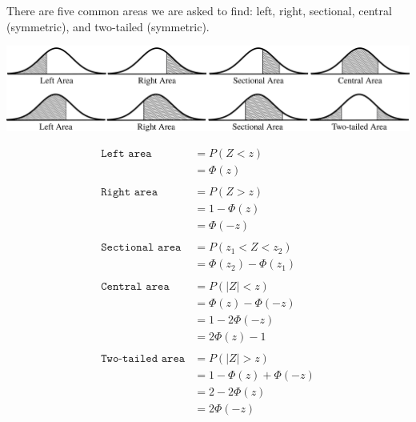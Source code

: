 \documentclass[12pt,letterpaper]{article}
\begin{document}
There are five common areas we are asked to find: left, right, sectional, central (symmetric), and two-tailed (symmetric).
\begin{center}
\includegraphics[scale=0.7]{types.png}
\end{center}
\begin{align*}
\texttt{Left area} &= P(Z<z)\\
 &= \Phi(z)\\\\
\texttt{Right area} &= P(Z>z) \\&= 1-\Phi(z) \\&= \Phi(-z)\\\\
\texttt{Sectional area} &= P(z_1<Z<z_2) \\&= \Phi(z_2) - \Phi(z_1)\\\\
\texttt{Central area} &= P(|Z|<z) \\&= \Phi(z)-\Phi(-z) \\&= 1-2\Phi(-z)\\ &= 2\Phi(z)-1\\\\
\texttt{Two-tailed area} &= P(|Z|>z) \\ &= 1-\Phi(z)+\Phi(-z) \\&=2-2\Phi(z) \\ &= 2\Phi(-z)
\end{align*}
\label{hi}
\end{document}
